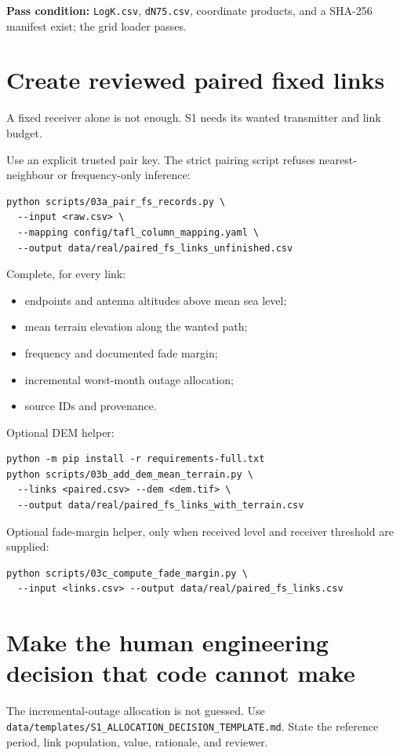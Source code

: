 \documentclass[11pt]{article}
\begin{document}
\textbf{Pass condition:} \texttt{LogK.csv}, \texttt{dN75.csv}, coordinate products, and a SHA-256 manifest exist; the grid loader passes.

\section{Create reviewed paired fixed links}

A fixed receiver alone is not enough. S1 needs its wanted transmitter and link budget.

Use an explicit trusted pair key. The strict pairing script refuses nearest-neighbour or frequency-only inference:
\begin{verbatim}
python scripts/03a_pair_fs_records.py \
  --input <raw.csv> \
  --mapping config/tafl_column_mapping.yaml \
  --output data/real/paired_fs_links_unfinished.csv
\end{verbatim}

Complete, for every link:
\begin{itemize}
\item endpoints and antenna altitudes above mean sea level;
\item mean terrain elevation along the wanted path;
\item frequency and documented fade margin;
\item incremental worst-month outage allocation;
\item source IDs and provenance.
\end{itemize}

Optional DEM helper:
\begin{verbatim}
python -m pip install -r requirements-full.txt
python scripts/03b_add_dem_mean_terrain.py \
  --links <paired.csv> --dem <dem.tif> \
  --output data/real/paired_fs_links_with_terrain.csv
\end{verbatim}

Optional fade-margin helper, only when received level and receiver threshold are supplied:
\begin{verbatim}
python scripts/03c_compute_fade_margin.py \
  --input <links.csv> --output data/real/paired_fs_links.csv
\end{verbatim}

\section{Make the human engineering decision that code cannot make}

The incremental-outage allocation is not guessed. Use \texttt{data/templates/S1\_ALLOCATION\_DECISION\_TEMPLATE.md}. State the reference period, link population, value, rationale, and reviewer.
\end{document}
